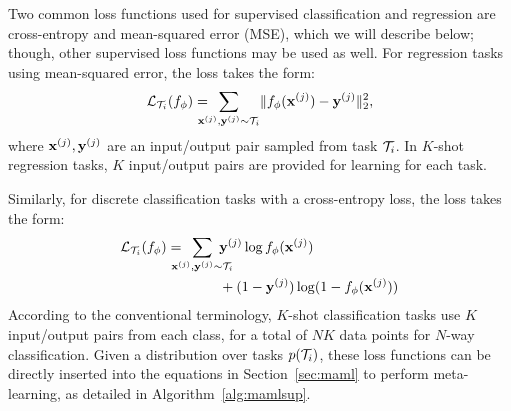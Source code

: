 \documentclass{article}
\begin{document}
Two common loss functions used for supervised classification and regression are cross-entropy and mean-squared error (MSE), which we will describe below; though, other supervised loss functions may be used as well. For regression tasks using mean-squared error, the loss takes the form:
\vspace{-0.15cm}
\begin{align}
\vspace{-0.2cm}
\label{eq:sup1}
\lossi(\learner_\phi ) = \!\!\!\!\!\! \sum_{\inp^{(j)}, \target^{(j)} \sim \task_i}  \lVert \learner_\phi(\inp^{(j)}) - \target^{(j)}  \rVert_2^2,
\end{align}
where $\mathbf{x}^{(j)}, \mathbf{y}^{(j)}$ are an input/output pair sampled from task $\mathcal{T}_i$. In $K$-shot regression tasks, $K$ input/output pairs are provided for learning for each task.

Similarly, for discrete classification tasks with a cross-entropy loss, the loss takes the form:
\vspace{-0.15cm}
\begin{equation}
\begin{aligned}
\label{eq:sup2}
\lossi( \learner_\phi ) = \!\!\!\!\!\! \sum_{\inp^{(j)}, \target^{(j)} \sim \task_i} \!\!\!\!\!\! &\target^{(j)} \log \learner_\phi(\inp^{(j)}) \\
&+(1-\target^{(j)}) \log (1-\learner_\phi(\inp^{(j)}))
\end{aligned}
\end{equation}
According to the conventional terminology, $K$-shot classification tasks use $K$ input/output pairs from each class, for a total of $NK$ data points for $N$-way classification. Given a distribution over tasks $p(\mathcal{T}_i)$, these loss functions can be directly inserted into the equations in Section~\ref{sec:maml} to perform meta-learning, as detailed in Algorithm~\ref{alg:mamlsup}.
\end{document}
